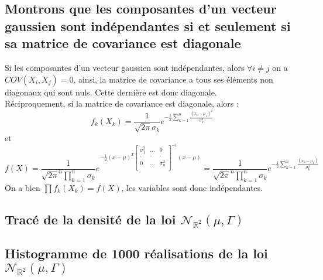 \documentclass{report}
\begin{document}
		\subsection{Montrons que les composantes d'un vecteur gaussien sont indépendantes si et seulement si sa matrice de covariance est diagonale}
			Si les composantes d'un vecteur gaussien sont indépendantes, alors $\forall i \neq j$ on a $COV(X_i, X_j) = 0$, ainsi, la matrice de covariance a tous ses éléments non diagonaux qui sont nuls. Cette dernière est donc diagonale.\\
			Réciproquement, si la matrice de covariance est diagonale, alors :
			\[ f_k(X_k) = \frac{1}{\sqrt{2\pi}\sigma_k}e^{-\frac{1}{2}\sum\limits_{k=1}^{n}\frac{(x_1 - \mu_1)^2}{\sigma_k^2}} \]
			et
			\[f(X) = \frac{1}{\sqrt{2\pi}^n\prod\limits_{k=1}^{n}\sigma_k}e^{-\frac{1}{2}(x-\mu)^T\left[ 
				\begin{array}{ccc} 
					\sigma_1^2 & ... & 0 \\
					\cdot & \cdot & \cdot \\
					0 & ... & \sigma_n^2 \\
				\end{array} 
			\right]^{-1}(x-\mu)} = \frac{1}{\sqrt{2\pi}^n\prod\limits_{k=1}^{n}\sigma_k}e^{-\frac{1}{2}\sum\limits_{k=1}^{n}\frac{(x_k - \mu_k)}{\sigma_k^2}} \]
			On a bien $\prod\limits f_k(X_k) = f(X)$, les variables sont donc indépendantes.

		\subsection{Tracé de la densité de la loi $\mathcal{N}_{\mathbb{R}^2}(\mu, \Gamma)$}
		\subsection{Histogramme de 1000 réalisations de la loi $\mathcal{N}_{\mathbb{R}^2}(\mu, \Gamma)$}
		
\end{document}
